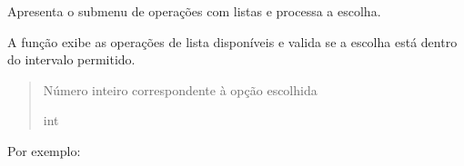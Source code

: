 \documentclass[letterpaper,10pt,portuges]{sphinxmanual}
\begin{document}

\begin{fulllineitems}
\label{\detokenize{main:main.menu_lista}}
\pysigstartsignatures
\pysiglinewithargsret
{}
{}
{}
\pysigstopsignatures
\sphinxAtStartPar
Apresenta o submenu de operações com listas e processa a escolha.

\sphinxAtStartPar
A função exibe as operações de lista disponíveis e valida se
a escolha está dentro do intervalo permitido.
\begin{quote}\begin{description}
\sphinxAtStartPar
Número inteiro correspondente à opção escolhida

\sphinxAtStartPar
int

\end{description}\end{quote}

\sphinxAtStartPar
Por exemplo:

\begin{sphinxVerbatim}[commandchars=\\\{\}]
\end{sphinxVerbatim}

\end{fulllineitems}

\end{document}
